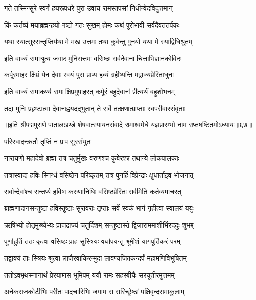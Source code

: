 \twolineshloka
{गते तस्मिन्सुरे स्वर्गं हयरूपधरे पुरा}
{उवाच रामस्तपसां निधीन्वेदविदुत्तमान्}%

\twolineshloka
{किं कर्तव्यं मयाब्रह्मन्हयो नष्टो गतः सुखम्}
{होमः कथं पुरोभावी सर्वदैवततर्पकः}%

\twolineshloka
{यथा स्यात्सुरसन्तृप्तिर्यथा मे मख उत्तमः}
{तथा कुर्वन्तु मुनयो यथा मे स्याद्विधिश्रुतम्}%

\twolineshloka
{इति वाक्यं समाश्रुत्य जगाद मुनिसत्तमः}
{वसिष्ठः सर्वदेवानां चित्ताभिज्ञानकोविदः}%

\twolineshloka
{कर्पूरमाहर क्षिप्रं येन देवाः स्वयं पुरा}
{प्राप्य हव्यं ग्रहीष्यन्ति मद्वाक्यप्रेरिताधुना}%

\twolineshloka
{इति वाक्यं समाकर्ण्य रामः क्षिप्रमुपाहरत्}
{कर्पूरं बहुदेवानां प्रीत्यर्थं बहुशोभनम्}%

\twolineshloka
{तदा मुनिः प्रहृष्टात्मा देवानाह्वयदद्भुतान्}
{ते सर्वे तत्क्षणात्प्राप्ताः स्वपरीवारसंवृताः}%

{॥इति श्रीपद्मपुराणे पातालखण्डे शेषवात्स्यायनसंवादे रामाश्वमेधे यज्ञप्रारम्भो नाम सप्तषष्टितमोऽध्यायः॥६७॥}



\onelineshloka
{परिस्वादन्क्रतौ तृप्तिं न प्राप सुरसंयुतः}%

\twolineshloka
{नारायणो महादेवो ब्रह्मा तत्र चतुर्मुखः}
{वरुणश्च कुबेरश्च तथान्ये लोकपालकाः}%

\twolineshloka
{तत्रास्वाद्य हविः स्निग्धं वसिष्ठेन परिष्कृतम्}
{तत्र पुनर्हि विप्रेन्द्राः क्षुधार्ताइव भोजनात्}%

\twolineshloka
{सर्वान्देवांश्च सन्तर्प्य हविषा करुणानिधिः}
{वसिष्ठप्रेरितः सर्वमिति कर्तव्यमाचरत्}%

\twolineshloka
{ब्राह्मणादानसन्तुष्टा हविस्तुष्टाः सुरावराः}
{तृप्ताः सर्वे स्वकं भागं गृहीत्वा स्वालयं ययुः}%

\twolineshloka
{ऋषिभ्यो होतृमुख्येभ्यः प्रादाद्राज्यं चतुर्दिशम्}
{सन्तुष्टास्ते द्विजाराममाशीर्भिरददुः शुभम्}%

\twolineshloka
{पूर्णाहुतिं ततः कृत्वा वसिष्ठः प्राह सुस्त्रियः}
{वर्धापयन्तु भूमीशं यागपूर्तिकरं परम्}%

\twolineshloka
{तद्वाक्यं ताः स्त्रियः श्रुत्वा लाजैरवाकिरन्मुदा}
{लावण्यजितकन्दर्पं महामणिविभूषितम्}%

\twolineshloka
{ततोऽवभृथस्नानार्थं प्रेरयामास भूमिपम्}
{ययौ रामः सहस्वीयैः सरयूतीरमुत्तमम्}%

\twolineshloka
{अनेकराजकोटीभिः परीतः पादचारिभिः}
{जगाम स सरिच्छ्रेष्ठां पक्षिवृन्दसमाकुलाम्}%

